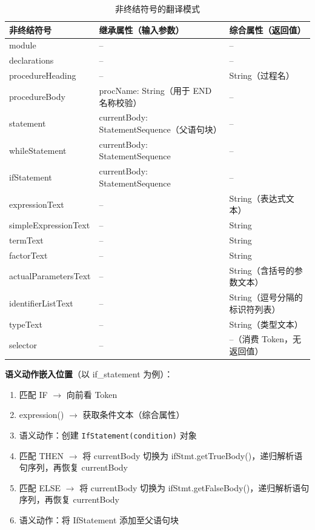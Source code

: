 \begin{table}[htbp]
    \centering\small
    \begin{tabular}{|p{3cm}|p{4.5cm}|p{4.8cm}|}
    \hline
    \textbf{非终结符号} & \textbf{继承属性（输入参数）} & \textbf{综合属性（返回值）} \\
    \hline
    module & -- & -- \\
    declarations & -- & -- \\
    procedureHeading & -- & String（过程名）\\
    procedureBody & procName: String（用于 END 名称校验） & -- \\
    statement & currentBody: StatementSequence（父语句块）& -- \\
    whileStatement & currentBody: StatementSequence & -- \\
    ifStatement & currentBody: StatementSequence & -- \\
    expressionText & -- & String（表达式文本）\\
    simpleExpressionText & -- & String \\
    termText & -- & String \\
    factorText & -- & String \\
    actualParametersText & -- & String（含括号的参数文本）\\
    identifierListText & -- & String（逗号分隔的标识符列表）\\
    typeText & -- & String（类型文本）\\
    selector & -- & --（消费 Token，无返回值）\\
    \hline
    \end{tabular}
    \caption{非终结符号的翻译模式}
    \label{tab:translation-scheme}
\end{table}

\textbf{语义动作嵌入位置}（以 if\_statement 为例）：
\begin{enumerate}
    \item 匹配 IF $\to$ 向前看 Token
    \item expression() $\to$ 获取条件文本（综合属性）
    \item 语义动作：创建 \texttt{IfStatement(condition)} 对象
    \item 匹配 THEN $\to$ 将 currentBody 切换为 ifStmt.getTrueBody()，递归解析语句序列，再恢复 currentBody
    \item 匹配 ELSE $\to$ 将 currentBody 切换为 ifStmt.getFalseBody()，递归解析语句序列，再恢复 currentBody
    \item 语义动作：将 IfStatement 添加至父语句块
\end{enumerate}

